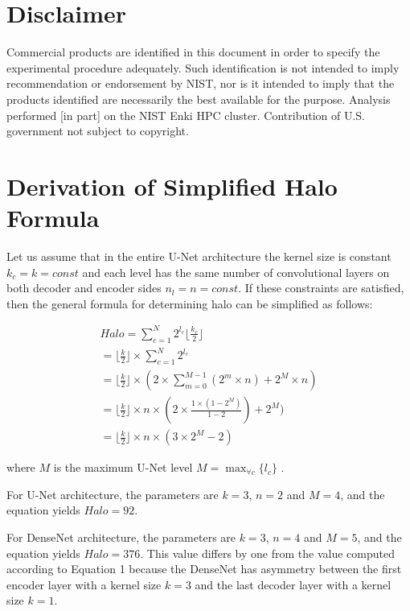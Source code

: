 \documentclass[10pt, indentfirst]{article}
\begin{document}
\section{Disclaimer}

Commercial products are identified in this document in order to specify the experimental procedure adequately. Such identification is not intended to imply recommendation or endorsement by NIST, nor is it intended to imply that the products identified are necessarily the best available for the purpose. Analysis performed [in part] on the NIST Enki HPC cluster. Contribution of U.S. government not subject to copyright.

\clearpage

\appendix
\section{Derivation of Simplified Halo Formula}

Let us assume that in the entire U-Net architecture the kernel size is constant $k_{c} = k = const$ and each level has the same number of convolutional layers on both decoder and encoder sides $n_{l} = n = const$. If these constraints are satisfied, then the general formula for determining halo can be simplified as follows:

\begin{equation}
\begin{aligned}
Halo = \sum_{c=1}^{N} 2^{l_c} \lfloor \frac{k_c}{2} \rfloor \\
= \lfloor \frac{k}{2} \rfloor \times \sum_{c=1}^{N} 2^{l_c} \\
= \lfloor \frac{k}{2} \rfloor \times ( 2 \times \sum_{m=0}^{M-1} (2^{m} \times n) + 2^{M} \times n )  \\
= \lfloor \frac{k}{2} \rfloor \times n \times ( 2 \times \frac{1 \times (1 - 2^M) }{ 1- 2} ) + 2^{M} )  \\
= \lfloor \frac{k}{2} \rfloor \times n \times (3 \times 2^{M} - 2) 
\end{aligned}
\label{eq:halo2}
\end{equation}

\noindent
where $M$ is the maximum U-Net level $M = \max_{\forall c}\{ l_{c} \}$ .

For U-Net architecture, the parameters are $k = 3$, $n=2$ and $M=4$, and the equation yields $Halo=92$.

For DenseNet architecture, the parameters are $k = 3$, $n=4$ and $M=5$, and the equation yields $Halo=376$. This value differs by one from the value computed according to Equation 1 because the DenseNet has asymmetry between the first encoder layer with a kernel size $k = 3$ and the last decoder layer with a kernel size $k = 1$.   
\end{document}
